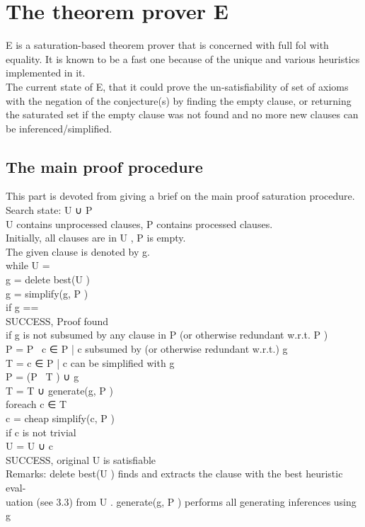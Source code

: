 \section{The theorem prover E} \label{sec:c2s3}
E is a saturation-based theorem prover that is concerned with full \ac{fol} with equality. It is known to be a fast one because of the unique and various heuristics implemented in it.
\\
The current state of E, that it could prove the un-satisfiability of set of axioms with the negation of the conjecture(s) by finding the empty clause, or returning the saturated set if the empty clause was not found and no more new clauses can be inferenced/simplified.
\\
\subsection{The main proof procedure}
This part is devoted from giving a brief on the main proof saturation procedure.
\\Search state: U ∪ P
\\U contains unprocessed clauses, P contains processed clauses.
\\Initially, all clauses are in U , P is empty.
\\The given clause is denoted by g.
\\while U = {}
\\g = delete best(U )
\\g = simplify(g, P )
\\if g ==
\\SUCCESS, Proof found
\\if g is not subsumed by any clause in P (or otherwise redundant w.r.t. P )
\\P = P \ {c ∈ P | c subsumed by (or otherwise redundant w.r.t.) g}
\\T = {c ∈ P | c can be simplified with g}
\\P = (P \ T ) ∪ {g}
\\T = T ∪ generate(g, P )
\\foreach c ∈ T
\\c = cheap simplify(c, P )
\\if c is not trivial
\\U = U ∪ {c}
\\SUCCESS, original U is satisfiable
\\Remarks: delete best(U ) finds and extracts the clause with the best heuristic eval-
\\uation (see 3.3) from U . generate(g, P ) performs all generating inferences using g
